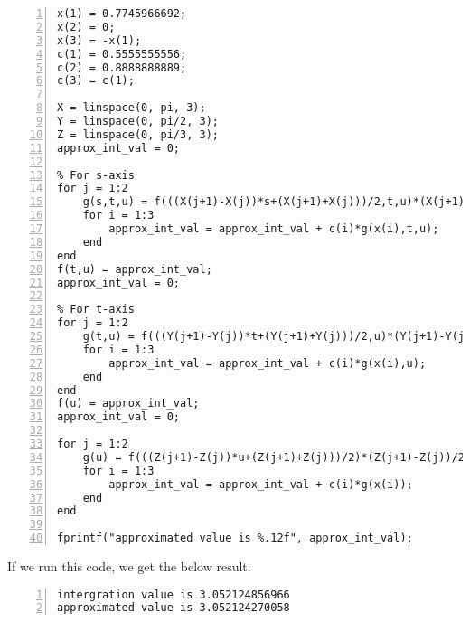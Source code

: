 \documentclass{article}
\begin{document}
\begin{enumerate}
\begin{lstlisting}[frame=single, numbers=left, style=Matlab-editor]
% composite gaussian quadrature
x(1) = 0.7745966692;
x(2) = 0;
x(3) = -x(1);
c(1) = 0.5555555556;
c(2) = 0.8888888889;
c(3) = c(1);

X = linspace(0, pi, 3);
Y = linspace(0, pi/2, 3);
Z = linspace(0, pi/3, 3);
approx_int_val = 0;

% For s-axis
for j = 1:2
    g(s,t,u) = f(((X(j+1)-X(j))*s+(X(j+1)+X(j)))/2,t,u)*(X(j+1)-X(j))/2;
    for i = 1:3
        approx_int_val = approx_int_val + c(i)*g(x(i),t,u);
    end
end
f(t,u) = approx_int_val;
approx_int_val = 0;

% For t-axis
for j = 1:2
    g(t,u) = f(((Y(j+1)-Y(j))*t+(Y(j+1)+Y(j)))/2,u)*(Y(j+1)-Y(j))/2;
    for i = 1:3
        approx_int_val = approx_int_val + c(i)*g(x(i),u);
    end
end
f(u) = approx_int_val;
approx_int_val = 0;

for j = 1:2
    g(u) = f(((Z(j+1)-Z(j))*u+(Z(j+1)+Z(j)))/2)*(Z(j+1)-Z(j))/2;
    for i = 1:3
        approx_int_val = approx_int_val + c(i)*g(x(i));
    end
end

fprintf("approximated value is %.12f", approx_int_val);
    \end{lstlisting} If we run this code, we get the below result: \begin{lstlisting}[frame=single, numbers=left, style=Matlab-editor]
intergration value is 3.052124856966
approximated value is 3.052124270058
    \end{lstlisting}
\end{enumerate}
\end{document}
